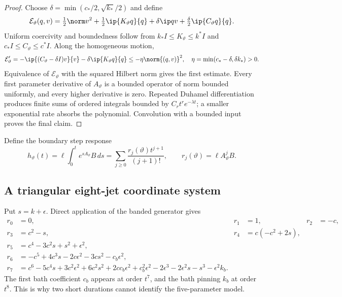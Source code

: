 \begin{proof}
Choose
\(\delta=\min(c_*/2,\sqrt{k_*}/2)\) and define
\[
 \mathcal E_\vartheta(q,v)
 =\tfrac12\norm v^2+\tfrac12\ip{K_\vartheta q}{q}
 +\delta\ip qv+\tfrac\delta2\ip{C_\vartheta q}{q}.
\]
Uniform coercivity and boundedness follow from
\(k_*I\le K_\vartheta\le k^*I\) and
\(c_*I\le C_\vartheta\le c^*I\).  Along the homogeneous motion,
\[
 \mathcal E_\vartheta'
 =-\ip{(C_\vartheta-\delta I)v}{v}
  -\delta\ip{K_\vartheta q}{q}
 \le-\eta\norm{(q,v)}^2,
 \quad \eta=\min(c_*-\delta,\delta k_*)>0.
\]
Equivalence of \(\mathcal E_\vartheta\) with the squared Hilbert norm gives
the first estimate.  Every first parameter derivative of \(A_\vartheta\) is
a bounded operator of norm bounded uniformly, and every higher derivative is
zero.  Repeated Duhamel differentiation produces finite sums of ordered
integrals bounded by \(C_rt^re^{-\lambda t}\); a smaller exponential rate
absorbs the polynomial.  Convolution with a bounded input proves the final
claim.
\end{proof}

Define the boundary step response
\[
 h_\vartheta(t)=\ell\int_0^te^{sA_\vartheta}B\,ds
 =\sum_{j\ge0}\frac{r_j(\vartheta)t^{j+1}}{(j+1)!},
 \qquad r_j(\vartheta)=\ell A_\vartheta^jB.
\]

\subsection{A triangular eight-jet coordinate system}

Put \(s=k+\epsilon\).  Direct application of the banded generator gives
\begin{equation}
\begin{aligned}
 r_0&=0,&r_1&=1,&r_2&=-c,\\
 r_3&=c^2-s,&
 r_4&=c(-c^2+2s),\\
 r_5&=c^4-3c^2s+s^2+\epsilon^2,\\
 r_6&=-c^5+4c^3s-2c\epsilon^2-3cs^2-c_b\epsilon^2,\\
 r_7&=c^6-5c^4s+3c^2\epsilon^2+6c^2s^2+2cc_b\epsilon^2
      +c_b^2\epsilon^2-2\epsilon^3-2\epsilon^2s-s^3-\epsilon^2k_b.
\end{aligned}
\label{eq:eight-jets}
\end{equation}
The first bath coefficient \(c_b\) appears at order \(t^7\), and the bath
pinning \(k_b\) at order \(t^8\).  This is why two short durations cannot
identify the five-parameter model.


